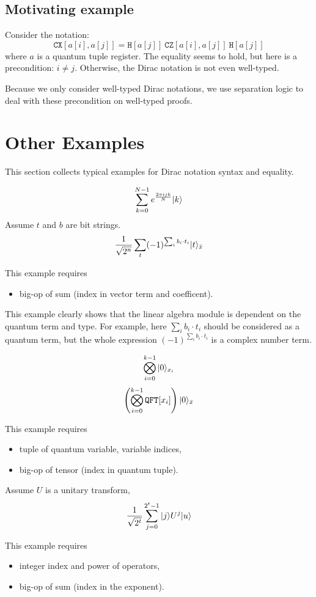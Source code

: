 \subsection{Motivating example}

Consider the notation:
$$
\texttt{CX}[a[i], a[j]] = \texttt{H}[a[j]]\ \texttt{CZ}[a[i], a[j]]\ \texttt{H}[a[j]]
$$
where $a$ is a quantum tuple register. The equality seems to hold, but here is a precondition: $i \neq j$. Otherwise, the Dirac notation is not even well-typed. 

Because we only consider well-typed Dirac notations, we use separation logic to deal with these precondition on well-typed proofs.

\section{Other Examples}

This section collects typical examples for Dirac notation syntax and equality.

\begin{example}
  $$
  \sum_{k=0}^{N-1} e^{\frac{2\pi i j k}{N}}|k\rangle
  $$
  Assume $t$ and $b$ are bit strings.
  $$
  \frac{1}{\sqrt{2^n}} \sum_t (-1)^{\sum_i b_i \cdot t_i} |t\rangle_{\bar{x}}
  $$\end{example}
This example requires
\begin{itemize}
  \item big-op of sum (index in vector term and coefficent).
\end{itemize}
This example clearly shows that the linear algebra module is dependent on the quantum term and type. For example, here $\sum_i b_i \cdot t_i$ should be considered as a quantum term, but the whole expression $(-1)^{\sum_i b_i \cdot t_i}$ is a complex number term.



\begin{example}
  $$
  \bigotimes_{i = 0}^{k-1} |0\rangle_{x_i}
  $$
  $$
  \left ( \bigotimes_{i = 0}^{k-1} \texttt{QFT}[x_i] \right ) |0\rangle_{\bar{x}}
  $$
\end{example}
This example requires 
\begin{itemize}
  \item tuple of quantum variable, variable indices,
  \item big-op of tensor (index in quantum tuple).
\end{itemize}

\begin{example}
  Assume $U$ is a unitary transform,
  $$
  \frac{1}{\sqrt{2^t}} \sum_{j=0}^{2^t-1} |j\rangle U^j |u\rangle
  $$
\end{example}
This example requires
\begin{itemize}
  \item integer index and power of operators,
  \item big-op of sum (index in the exponent).
\end{itemize}

